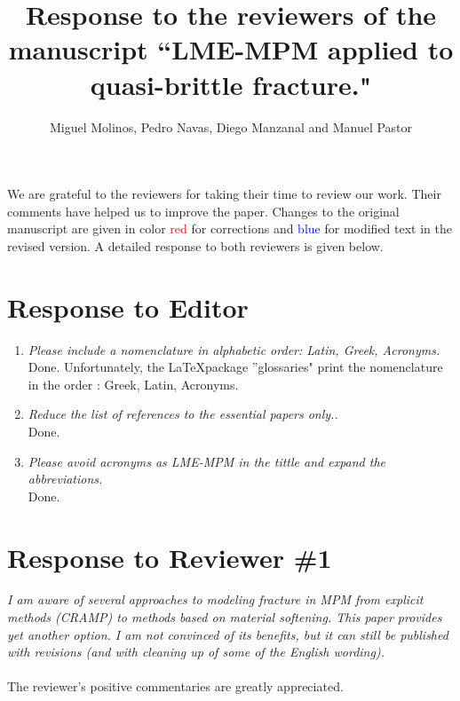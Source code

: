 \documentclass[12pt]{article}
\title{Response to the reviewers of the manuscript ``LME-MPM applied to quasi-brittle fracture."}
\author{Miguel Molinos, Pedro Navas, Diego Manzanal and Manuel Pastor\\}
\date{}
\begin{document}
\maketitle

We are grateful to the reviewers for taking their time  to review our work. Their comments have helped us to improve the paper. Changes to the original manuscript are given in  color \textcolor{red}{red} for corrections and  \textcolor{blue}{blue} for modified text in the revised version.  A detailed response to both reviewers is given below.

\section*{Response to Editor}

 \begin{enumerate}

\item \textit{Please include a nomenclature in alphabetic order: Latin, Greek, Acronyms.}\\

Done. Unfortunately, the \LaTeX package ''glossaries" print the nomenclature in the order : Greek, Latin, Acronyms. 
 
\item \textit{Reduce the list of references to the essential papers only..}\\

Done.
  
\item \textit{Please avoid acronyms as LME-MPM in the tittle and expand the abbreviations.}\\

Done.

 \end{enumerate}

\section*{Response to Reviewer \#1}
{\it
I am aware of several approaches to modeling fracture in MPM from explicit methods (CRAMP) to methods based on material softening. This paper provides yet another option. I am not convinced of its benefits, but it can still be published with revisions (and with cleaning up of some of the English wording).
}
\\
\\
The reviewer's positive commentaries are greatly appreciated.
\\
\end{document}
